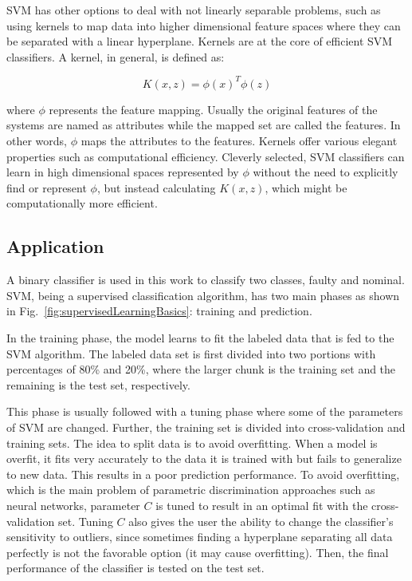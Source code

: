 SVM has other options to deal with not linearly separable problems, such as using kernels to map data into higher dimensional feature spaces where they can be separated with a linear hyperplane. Kernels are at the core of efficient SVM classifiers. A kernel, in general, is defined as:

\begin{equation}
K (x,z) = {\phi(x)}^T \phi(z)
\end{equation}

where $\phi$ represents the feature mapping. Usually the original features of the systems are named as attributes while the mapped set are called the features. In other words, $\phi$ maps the attributes to the features. Kernels offer various elegant properties such as computational efficiency. 
Cleverly selected, SVM classifiers can learn in high dimensional spaces represented by $\phi$ without the need to explicitly find or represent $\phi$, but instead calculating $K(x,z)$, which might be computationally more efficient. 

 
\subsection{Application}


A binary classifier is used in this work to classify two classes, faulty and nominal. 
SVM, being a supervised classification algorithm, has two main phases as shown in Fig.~\ref{fig:supervisedLearningBasics}: training and prediction. 


In the training phase, the model learns to fit the labeled data that is fed to the SVM algorithm. The labeled data set is first divided into two portions with percentages of 80\% and 20\%, where the larger chunk is the training set and the remaining is the test set, respectively.

This phase is usually followed with a tuning phase where some of the parameters of SVM are changed. Further, the training set is divided into cross-validation and training sets. The idea to split data is to avoid overfitting. When a model is overfit, it fits very accurately to the data it is trained with but fails to generalize to new data. This results in a poor prediction performance. To avoid overfitting, which is the main problem of parametric discrimination approaches such as neural networks, parameter $C$ is tuned to result in an optimal fit with the cross-validation set. Tuning $C$ also gives the user the ability to change the classifier's sensitivity to outliers, since sometimes finding a hyperplane separating all data perfectly is not the favorable option (it may cause overfitting). Then, the final performance of the classifier is tested on the test set. 


